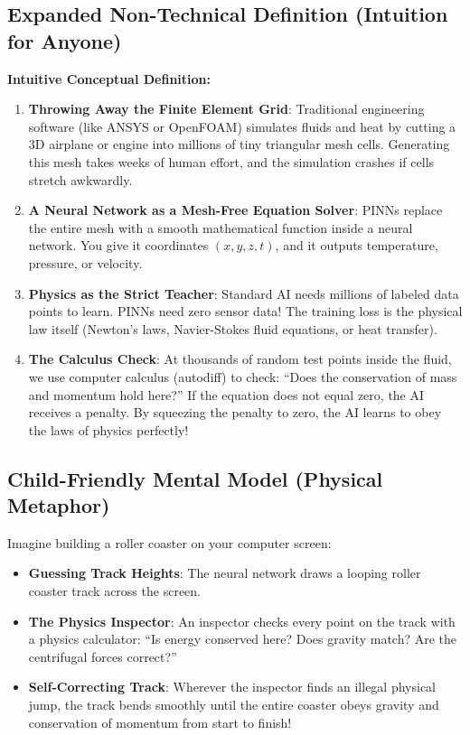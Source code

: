 \documentclass[11pt,a4paper]{article}
\theoremstyle{definition}
\begin{document}
\subsection{Expanded Non-Technical Definition (Intuition for Anyone)}
\textbf{Intuitive Conceptual Definition:}
\begin{enumerate}
    \item \textbf{Throwing Away the Finite Element Grid}: Traditional engineering software (like ANSYS or OpenFOAM) simulates fluids and heat by cutting a 3D airplane or engine into millions of tiny triangular mesh cells. Generating this mesh takes weeks of human effort, and the simulation crashes if cells stretch awkwardly.
    \item \textbf{A Neural Network as a Mesh-Free Equation Solver}: PINNs replace the entire mesh with a smooth mathematical function inside a neural network. You give it coordinates $(x, y, z, t)$, and it outputs temperature, pressure, or velocity.
    \item \textbf{Physics as the Strict Teacher}: Standard AI needs millions of labeled data points to learn. PINNs need zero sensor data! The training loss is the physical law itself (Newton's laws, Navier-Stokes fluid equations, or heat transfer).
    \item \textbf{The Calculus Check}: At thousands of random test points inside the fluid, we use computer calculus (autodiff) to check: ``Does the conservation of mass and momentum hold here?'' If the equation does not equal zero, the AI receives a penalty. By squeezing the penalty to zero, the AI learns to obey the laws of physics perfectly!
\end{enumerate}

\subsection{Child-Friendly Mental Model (Physical Metaphor)}
Imagine building a roller coaster on your computer screen:
\begin{itemize}
    \item \textbf{Guessing Track Heights}: The neural network draws a looping roller coaster track across the screen.
    \item \textbf{The Physics Inspector}: An inspector checks every point on the track with a physics calculator: ``Is energy conserved here? Does gravity match? Are the centrifugal forces correct?''
    \item \textbf{Self-Correcting Track}: Wherever the inspector finds an illegal physical jump, the track bends smoothly until the entire coaster obeys gravity and conservation of momentum from start to finish!
\end{itemize}
\end{document}
